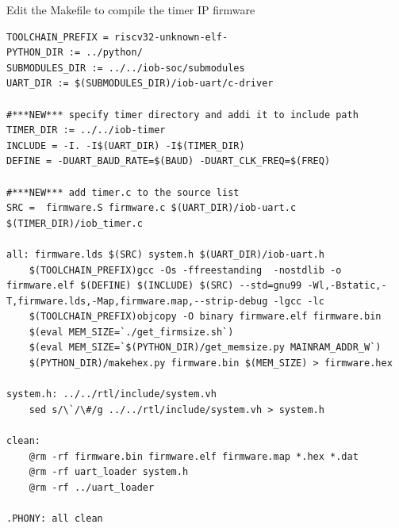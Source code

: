 \documentclass [xcolor=svgnames, t] {beamer}
\begin{document}
\begin{frame}[fragile]{Edit the Makefile to compile the timer IP firmware}
\begin{tiny}
\begin{lstlisting}
TOOLCHAIN_PREFIX = riscv32-unknown-elf-
PYTHON_DIR := ../python/
SUBMODULES_DIR := ../../iob-soc/submodules
UART_DIR := $(SUBMODULES_DIR)/iob-uart/c-driver

#***NEW*** specify timer directory and addi it to include path 
TIMER_DIR := ../../iob-timer
INCLUDE = -I. -I$(UART_DIR) -I$(TIMER_DIR)
DEFINE = -DUART_BAUD_RATE=$(BAUD) -DUART_CLK_FREQ=$(FREQ)

#***NEW*** add timer.c to the source list
SRC =  firmware.S firmware.c $(UART_DIR)/iob-uart.c  $(TIMER_DIR)/iob_timer.c

all: firmware.lds $(SRC) system.h $(UART_DIR)/iob-uart.h
	$(TOOLCHAIN_PREFIX)gcc -Os -ffreestanding  -nostdlib -o firmware.elf $(DEFINE) $(INCLUDE) $(SRC) --std=gnu99 -Wl,-Bstatic,-T,firmware.lds,-Map,firmware.map,--strip-debug -lgcc -lc
	$(TOOLCHAIN_PREFIX)objcopy -O binary firmware.elf firmware.bin
	$(eval MEM_SIZE=`./get_firmsize.sh`)
	$(eval MEM_SIZE=`$(PYTHON_DIR)/get_memsize.py MAINRAM_ADDR_W`)
	$(PYTHON_DIR)/makehex.py firmware.bin $(MEM_SIZE) > firmware.hex

system.h: ../../rtl/include/system.vh
	sed s/\`/\#/g ../../rtl/include/system.vh > system.h

clean:
	@rm -rf firmware.bin firmware.elf firmware.map *.hex *.dat
	@rm -rf uart_loader system.h
	@rm -rf ../uart_loader

.PHONY: all clean
\end{lstlisting}
\end{tiny}
\end{frame}
\end{document}
